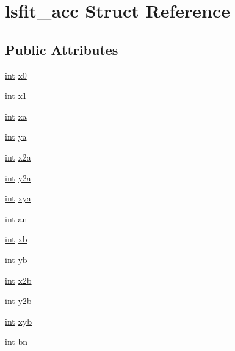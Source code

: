 \hypertarget{structlsfit__acc}{}\section{lsfit\+\_\+acc Struct Reference}
\label{structlsfit__acc}
\subsection*{Public Attributes}
\begin{DoxyCompactItemize}
\item 
\hyperlink{xmltok_8h_a5a0d4a5641ce434f1d23533f2b2e6653}{int} \hyperlink{structlsfit__acc_a74726b2c76f9e7ccd8f7c70b24e679e2}{x0}
\item 
\hyperlink{xmltok_8h_a5a0d4a5641ce434f1d23533f2b2e6653}{int} \hyperlink{structlsfit__acc_a81222dea0374164b72030f27b3fc0eb3}{x1}
\item 
\hyperlink{xmltok_8h_a5a0d4a5641ce434f1d23533f2b2e6653}{int} \hyperlink{structlsfit__acc_aca2a73c1ac7e72c7a256e6128a7fdc0f}{xa}
\item 
\hyperlink{xmltok_8h_a5a0d4a5641ce434f1d23533f2b2e6653}{int} \hyperlink{structlsfit__acc_a26e05cb633bf0845ad123ca3bf432061}{ya}
\item 
\hyperlink{xmltok_8h_a5a0d4a5641ce434f1d23533f2b2e6653}{int} \hyperlink{structlsfit__acc_a14c369e28b59a48a2a3c70c80ab3bce3}{x2a}
\item 
\hyperlink{xmltok_8h_a5a0d4a5641ce434f1d23533f2b2e6653}{int} \hyperlink{structlsfit__acc_ae6408438922bd96bfc0008fee1e2f43c}{y2a}
\item 
\hyperlink{xmltok_8h_a5a0d4a5641ce434f1d23533f2b2e6653}{int} \hyperlink{structlsfit__acc_a7479d7df5f1f76eb38f020598dc347ed}{xya}
\item 
\hyperlink{xmltok_8h_a5a0d4a5641ce434f1d23533f2b2e6653}{int} \hyperlink{structlsfit__acc_ad21459eeaddd7da027130b622e02bad9}{an}
\item 
\hyperlink{xmltok_8h_a5a0d4a5641ce434f1d23533f2b2e6653}{int} \hyperlink{structlsfit__acc_a63109c854fc23e51337513344e3c1266}{xb}
\item 
\hyperlink{xmltok_8h_a5a0d4a5641ce434f1d23533f2b2e6653}{int} \hyperlink{structlsfit__acc_af9a2278c05a1861ab193dc90badefce4}{yb}
\item 
\hyperlink{xmltok_8h_a5a0d4a5641ce434f1d23533f2b2e6653}{int} \hyperlink{structlsfit__acc_aefa3b90f474ae621805595d2a89ef2f0}{x2b}
\item 
\hyperlink{xmltok_8h_a5a0d4a5641ce434f1d23533f2b2e6653}{int} \hyperlink{structlsfit__acc_af8c258fca96de2da6190dd82b1a9e66e}{y2b}
\item 
\hyperlink{xmltok_8h_a5a0d4a5641ce434f1d23533f2b2e6653}{int} \hyperlink{structlsfit__acc_ab9e3ed10bb6252ede78e5514496391b4}{xyb}
\item 
\hyperlink{xmltok_8h_a5a0d4a5641ce434f1d23533f2b2e6653}{int} \hyperlink{structlsfit__acc_a5b0d1e6a5f5096c5c3bdfd3a516993f2}{bn}
\end{DoxyCompactItemize}



